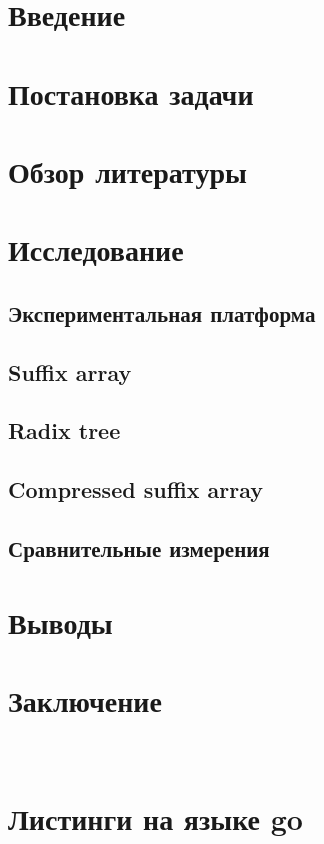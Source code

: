 \newpage
\tableofcontents
\newpage

\section{Введение}


\newpage
\section{Постановка задачи}


\newpage
\section{Обзор литературы}


\newpage
\section{Исследование}


\newpage
\subsection{Экспериментальная платформа}


\newpage
\subsection{Suffix array}


\newpage
\subsection{Radix tree}


\newpage
\subsection{Compressed suffix array}


\newpage
\subsection{Сравнительные измерения}
%

\newpage
\section{Выводы}

\newpage
\section{Заключение}

\newpage
\appendix
\section{\\Листинги на языке go}

